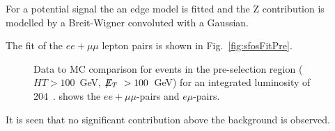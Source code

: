 For a potential signal the an edge model
is fitted and the Z contribution
is modelled by a Breit-Wigner convoluted 
with a Gaussian.

The fit of the $ee+\mu\mu$ lepton pairs is shown
in Fig.~\ref{fig:sfosFitPre}.

\begin{figure}[hbtp]
  \hfill
  \hfill
  \caption{Data to MC comparison for events in the pre-selection region ($HT>100$~GeV, $\displaystyle{\not} E_T~> 100$~GeV)
  for an integrated luminosity of 204~\pbi.  shows the $ee+\mu\mu$-pairs and
  $e\mu$-pairs.}
\end{figure}

It is seen that no significant contribution
above the background is observed.
